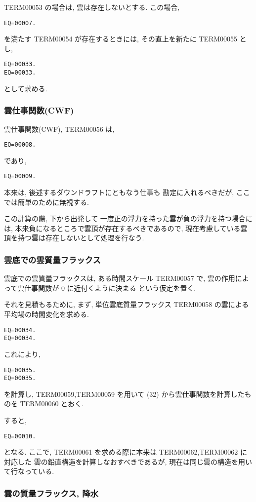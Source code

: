 TERM00053 の場合は,
雲は存在しないとする. この場合,
\begin{verbatim}
EQ=00007.
\end{verbatim}
を満たす TERM00054 が存在するときには,
その直上を新たに TERM00055 とし,
\begin{verbatim}
EQ=00033.
EQ=00033.
\end{verbatim}
として求める.

\subsubsection{雲仕事関数(CWF)}

雲仕事関数(CWF), TERM00056 は,
\begin{verbatim}
EQ=00008.
\end{verbatim}
であり,
\begin{verbatim}
EQ=00009.
\end{verbatim}
本来は, 後述するダウンドラフトにともなう仕事も
勘定に入れるべきだが, ここでは簡単のために無視する.

この計算の際, 下から出発して
一度正の浮力を持った雲が負の浮力を持つ場合には,
本来負になるところで雲頂が存在するべきであるので,
現在考慮している雲頂を持つ雲は存在しないとして処理を行なう.

\subsubsection{雲底での雲質量フラックス}

雲底での雲質量フラックスは,
ある時間スケール TERM00057 で,
雲の作用によって雲仕事関数が 0 に近付くように決まる
という仮定を置く.

それを見積もるために, まず, 単位雲底質量フラックス TERM00058 の雲による
平均場の時間変化を求める.
\begin{verbatim}
EQ=00034.
EQ=00034.
\end{verbatim}
これにより,
\begin{verbatim}
EQ=00035.
EQ=00035.
\end{verbatim}
を計算し, TERM00059,TERM00059 を用いて
(32) から雲仕事関数を計算したものを TERM00060 とおく.

すると,
\begin{verbatim}
EQ=00010.
\end{verbatim}
となる.
ここで, TERM00061 を求める際に本来は TERM00062,TERM00062 に対応した
雲の鉛直構造を計算しなおすべきであるが, 
現在は同じ雲の構造を用いて行なっている.

\subsubsection{雲の質量フラックス, 降水}

